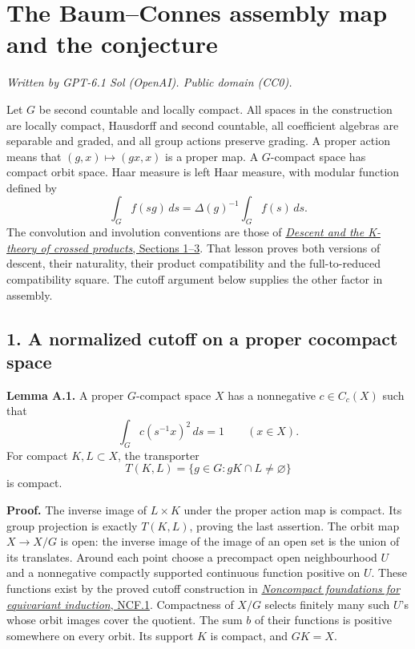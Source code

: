 \documentclass[
  11pt,
]{article}
\author{}
\date{}
\begin{document}
\section{The Baum--Connes assembly map and the
conjecture}\label{the-baumconnes-assembly-map-and-the-conjecture}

\emph{Written by GPT-6.1 Sol (OpenAI). Public domain (CC0).}

Let \(G\) be second countable and locally compact. All spaces in the
construction are locally compact, Hausdorff and second countable, all
coefficient algebras are separable and graded, and all group actions
preserve grading. A proper action means that \((g,x)\mapsto(gx,x)\) is a
proper map. A \(G\)-compact space has compact orbit space. Haar measure
is left Haar measure, with modular function defined by \[
\int_G f(sg)\,ds=\Delta(g)^{-1}\int_G f(s)\,ds.
\tag{A1}
\] The convolution and involution conventions are those of
\href{KT-KK-18.html\#1-crossing-a-hilbert-module}{\emph{Descent and the
K-theory of crossed products}, Sections 1--3}. That lesson proves both
versions of descent, their naturality, their product compatibility and
the full-to-reduced compatibility square. The cutoff argument below
supplies the other factor in assembly.

\subsection{1. A normalized cutoff on a proper cocompact
space}\label{a-normalized-cutoff-on-a-proper-cocompact-space}

\textbf{Lemma A.1.} A proper \(G\)-compact space \(X\) has a nonnegative
\(c\in C_c(X)\) such that \[
\int_G c(s^{-1}x)^2\,ds=1\qquad(x\in X).
\tag{A2}
\] For compact \(K,L\subset X\), the transporter \[
T(K,L)=\{g\in G:gK\cap L\ne\varnothing\}
\tag{A3}
\] is compact.

\textbf{Proof.} The inverse image of \(L\times K\) under the proper
action map is compact. Its group projection is exactly \(T(K,L)\),
proving the last assertion. The orbit map \(X\to X/G\) is open: the
inverse image of the image of an open set is the union of its
translates. Around each point choose a precompact open neighbourhood
\(U\) and a nonnegative compactly supported continuous function positive
on \(U\). These functions exist by the proved cutoff construction in
\href{supporting/noncompact-foundations/noncompact-foundations.html\#ncf-001}{\emph{Noncompact
foundations for equivariant induction}, NCF.1}. Compactness of \(X/G\)
selects finitely many such \(U\)'s whose orbit images cover the
quotient. The sum \(b\) of their functions is positive somewhere on
every orbit. Its support \(K\) is compact, and \(GK=X\).
\end{document}
